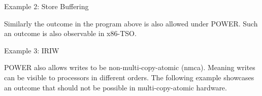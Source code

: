 \documentclass[notes, xcolor=dvipsnames]{beamer}
\begin{document}
    \begin{frame}{Example 2: Store Buffering}
        
        \begin{figure}
        \end{figure}

        Similarly the outcome in the program above is also allowed under POWER.
        Such an outcome is also observable in x86-TSO.

    \end{frame}

    \begin{frame}{Example 3: IRIW}

        POWER also allows writes to be non-multi-copy-atomic (nmca). 
        Meaning writes can be visible to processors in different orders. 
        The following example showcases an outcome that should not be possible in multi-copy-atomic hardware.
        \begin{figure}
        \end{figure}

    \end{frame}
\end{document}
